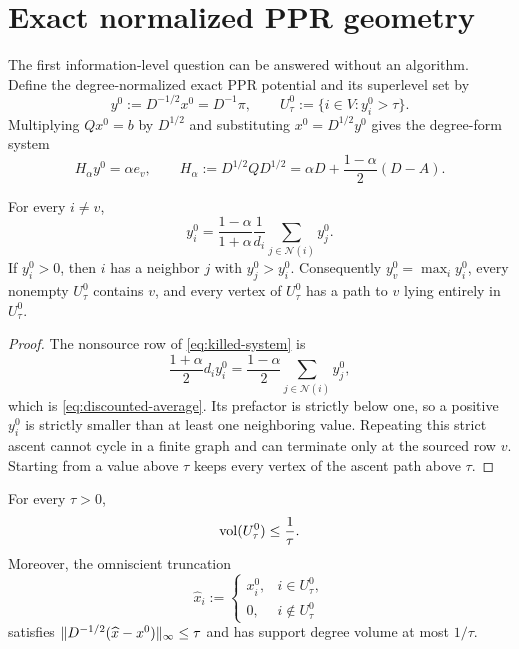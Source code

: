 \section{Exact normalized PPR geometry}
\label{sec:normalized-geometry}

The first information-level question can be answered without an algorithm.
Define the degree-normalized exact PPR potential and its superlevel set by
\begin{equation}
 y^0:=D^{-1/2}x^0=D^{-1}\pi,
 \qquad
 U_\tau^0:=\{i\in V:y_i^0>\tau\}.
 \label{eq:normalized-potential}
\end{equation}
Multiplying $Qx^0=b$ by $D^{1/2}$ and substituting
$x^0=D^{1/2}y^0$ gives the degree-form system
\begin{equation}
 H_\alpha y^0=\alpha e_v,
 \qquad
 H_\alpha:=D^{1/2}QD^{1/2}
 =\alpha D+\frac{1-\alpha}{2}(D-A).
 \label{eq:killed-system}
\end{equation}

\begin{lemma}
\label{lem:strict-ascent}
For every $i\neq v$,
\begin{equation}
 y_i^0
 =\frac{1-\alpha}{1+\alpha}
   \frac1{d_i}\sum_{j\in\mathcal N(i)}y_j^0.
 \label{eq:discounted-average}
\end{equation}
If $y_i^0>0$, then $i$ has a neighbor $j$ with $y_j^0>y_i^0$.
Consequently $y_v^0=\max_i y_i^0$, every nonempty $U_\tau^0$ contains $v$,
and every vertex of $U_\tau^0$ has a path to $v$ lying entirely in
$U_\tau^0$.
\end{lemma}

\begin{proof}
The nonsource row of \cref{eq:killed-system} is
\[
 \frac{1+\alpha}{2}d_i y_i^0
 =\frac{1-\alpha}{2}\sum_{j\in\mathcal N(i)}y_j^0,
\]
which is \cref{eq:discounted-average}.  Its prefactor is strictly below one,
so a positive $y_i^0$ is strictly smaller than at least one neighboring
value.  Repeating this strict ascent cannot cycle in a finite graph and can
terminate only at the sourced row $v$.  Starting from a value above $\tau$
keeps every vertex of the ascent path above $\tau$.
\end{proof}

\begin{theorem}
\label{thm:information-core}
For every $\tau>0$,
\begin{equation}
 \operatorname{vol}(U_\tau^0)\leq\frac1\tau.
 \label{eq:information-core-volume}
\end{equation}
Moreover, the omniscient truncation
\begin{equation}
 \widehat x_i:=
 \begin{cases}
 x_i^0,&i\in U_\tau^0,\\
 0,&i\notin U_\tau^0
 \end{cases}
 \label{eq:omniscient-truncation}
\end{equation}
satisfies
$\lVert D^{-1/2}(\widehat x-x^0)\rVert_\infty\leq\tau$ and has support degree
volume at most $1/\tau$.
\end{theorem}

